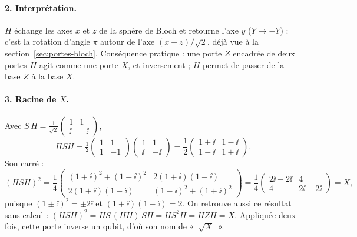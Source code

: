 \begin{correction}
\paragraph{2. Interprétation.} $H$ échange les axes $x$ et $z$ de la sphère de Bloch et retourne
l'axe $y$ ($Y\to-Y$) : c'est la rotation d'angle $\pi$ autour de l'axe $(x+z)/\sqrt2$, déjà vue à la
section~\ref{sec:portes-bloch}. Conséquence pratique : une porte $Z$ encadrée de deux portes $H$
agit comme une porte $X$, et inversement ; $H$ permet de passer de la base $Z$ à la base $X$.

\paragraph{3. Racine de $X$.} Avec $S\,H=\frac{1}{\sqrt2}\begin{pmatrix}1&1\\\ii&-\ii\end{pmatrix}$,
\[
  HSH=\tfrac12\begin{pmatrix}1&1\\1&-1\end{pmatrix}\begin{pmatrix}1&1\\\ii&-\ii\end{pmatrix}
  =\frac12\begin{pmatrix}1+\ii&1-\ii\\1-\ii&1+\ii\end{pmatrix}.
\]
Son carré :
\[
  (HSH)^2=\frac14\begin{pmatrix}(1+\ii)^2+(1-\ii)^2&2(1+\ii)(1-\ii)\\2(1+\ii)(1-\ii)&(1-\ii)^2+(1+\ii)^2\end{pmatrix}
  =\frac14\begin{pmatrix}2\ii-2\ii&4\\4&2\ii-2\ii\end{pmatrix}=X,
\]
puisque $(1\pm\ii)^2=\pm2\ii$ et $(1+\ii)(1-\ii)=2$. On retrouve aussi ce résultat sans calcul :
$(HSH)^2=HS\,(H H)\,SH=HS^2H=HZH=X$. Appliquée deux fois, cette porte inverse un qubit, d'où son nom de
«~$\sqrt{X}$~».
\end{correction}

